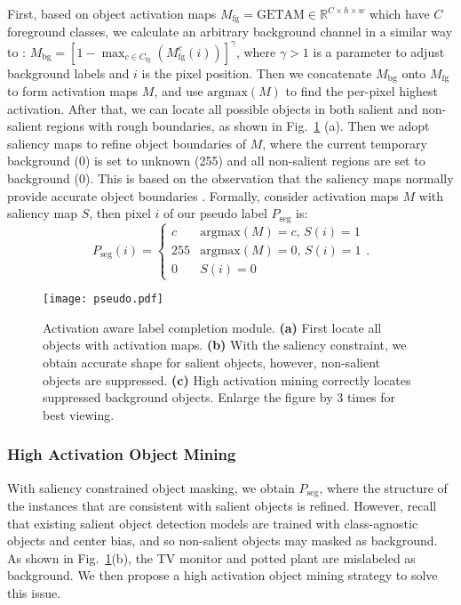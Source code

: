 \documentclass[10pt,twocolumn,letterpaper]{article}
\begin{document}
First, based on object activation maps $M_{\text{fg}} = \text{GETAM} \in \mathbb{R}^{C\times h\times w }$ which have $C$ foreground classes, 
we calculate an arbitrary background channel in a similar way to \cite{ahn2018learning}: 
$
M_{\text{bg}} = \left[ 1-\max_{c\in{C_{\text{fg}}}}\left(M_{\text{fg}}^{c}(i)\right) \right] ^{\gamma}
$, 
where $\gamma>1$ is a parameter to adjust background labels and
$i$ is the pixel position.
Then we concatenate 
$M_{\text{bg}}$ onto $M_{\text{fg}}$ to form activation maps $M$,
and use $\text{argmax}(M)$ to find the per-pixel highest activation.
After that, we can locate all possible objects in both salient and non-salient regions with rough boundaries, as shown in Fig.~\ref{fig:pseudo generation} (a).
Then we adopt saliency maps 
to refine object boundaries of $M$, where
the current temporary background (0) is set to unknown (255) and
all non-salient regions 
are set to background (0).
This is based on the observation
that the saliency maps normally provide accurate object boundaries \cite{yao2021non,lee2021railroad,wang2021weakly}. 
Formally, consider activation maps $M$ with saliency map $S$, then pixel $i$ of our pseudo label $P_\text{seg}$ is:
\begin{equation}
P_{\text{seg}}(i) = \begin{cases}
     c  &  \text{$\text{argmax}(M) = c$,  $S(i) = 1$} \\
    255   &  \text{$\text{argmax}(M) = 0$,  $S(i) = 1$} \\
    0   &  \text{$S(i) = 0$}
 \end{cases}. 
\end{equation}



\begin{figure}[!t]
   \begin{center}
   {\texttt{[image: pseudo.pdf]}} 
   \end{center}
\caption{Activation aware label completion module.
\textbf{(a)} First locate all objects
with activation maps.
\textbf{(b)} With the saliency constraint, we obtain accurate shape for salient objects, however,
non-salient objects are suppressed.
\textbf{(c)} High activation mining correctly locates suppressed background objects.
Enlarge the figure by 3 times for best viewing.
}
\label{fig:pseudo generation}
\end{figure}


\subsubsection{High Activation Object Mining} With saliency constrained object masking, we obtain $P_{\text{seg}}$, where the structure of the instances that are consistent with salient objects is refined. 
However, recall that existing salient object detection models are trained with class-agnostic objects and center bias, and so
non-salient objects may masked as background. 
As shown in Fig.~\ref{fig:pseudo generation}(b), the TV monitor and potted plant are mislabeled as background. 
We then propose a high activation object mining strategy to solve this issue.
\end{document}
